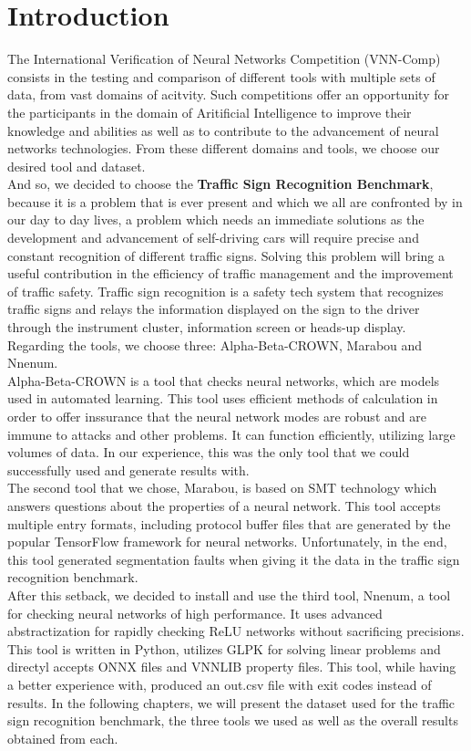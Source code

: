 \documentclass[12pt,a4paper]{report}
\newcommand\tab[1][5mm]{\hspace*{#1}}
\begin{document}
\tableofcontents

\chapter{Introduction}
\tab The International Verification of Neural Networks Competition (VNN-Comp) consists in the testing and comparison of different tools with multiple sets of data, from vast domains of acitvity. Such competitions offer an opportunity for the participants in the domain of Aritificial Intelligence to improve their knowledge and abilities as well as to contribute to the advancement of neural networks technologies. From these different domains and tools, we choose our desired tool and dataset.\\
\tab And so, we decided to choose the \textbf{Traffic Sign Recognition Benchmark}, because it is a problem that is ever present and which we all are confronted by in our day to day lives, a problem which needs an immediate solutions as the development and advancement of self-driving cars will require precise and constant recognition of different traffic signs. Solving this problem will bring a useful contribution in the efficiency of traffic management and the improvement of traffic safety. Traffic sign recognition is a safety tech system that recognizes traffic signs and relays the information displayed on the sign to the driver through the instrument cluster, information screen or heads-up display. Regarding the tools, we choose three: Alpha-Beta-CROWN, Marabou and Nnenum.\\
\tab Alpha-Beta-CROWN is a tool that checks neural networks, which are models used in automated learning. This tool uses efficient methods of calculation in order to offer inssurance that the neural network modes are robust and are immune to attacks and other problems. It can function efficiently, utilizing large volumes of data. In our experience, this was the only tool that we could successfully used and generate results with.\\
\tab The second tool that we chose, Marabou, is based on SMT technology which answers questions about the properties of a neural network. This tool accepts multiple entry formats, including protocol buffer files that are generated by the popular TensorFlow framework for neural networks. Unfortunately, in the end, this tool generated segmentation faults when giving it the data in the traffic sign recognition benchmark.\\
\tab After this setback, we decided to install and use the third tool, Nnenum, a tool for checking neural networks of high performance. It uses advanced abstractization for rapidly checking ReLU networks without sacrificing precisions. This tool is written in Python, utilizes GLPK for solving linear problems and directyl accepts ONNX files and VNNLIB property files. This tool, while having a better experience with, produced an out.csv file with exit codes instead of results. In the following chapters, we will present the dataset used for the traffic sign recognition benchmark, the three tools we used as well as the overall results obtained from each.
\end{document}
